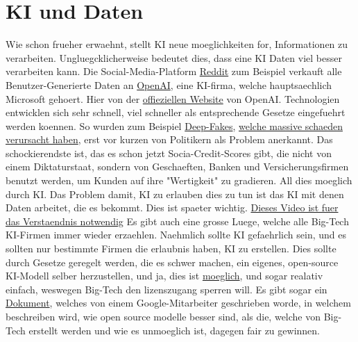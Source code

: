 \documentclass{report}
\begin{document}
\section{KI und Daten}
Wie schon frueher erwaehnt, stellt KI neue moeglichkeiten for, Informationen zu verarbeiten. Ungluegcklicherweise bedeutet dies, dass eine KI Daten viel besser verarbeiten kann.
Die Social-Media-Platform \hyperlink{reddit.com}{Reddit} zum Beispiel verkauft alle Benutzer-Generierte Daten an \hyperlink{https://openai.com/}{OpenAI}, eine KI-firma, welche hauptsaechlich Microsoft gehoert.
Hier von der \hyperlink{https://openai.com/index/openai-and-reddit-partnership/}{offieziellen Website} von OpenAI. 
\newline
\newline
Technologien entwicklen sich sehr schnell, viel schneller als entsprechende Gesetze eingefuehrt werden koennen. So wurden zum Beispiel \hyperlink{https://en.wikipedia.org/wiki/Deepfake}{Deep-Fakes}, \hyperlink{https://edition.cnn.com/2024/05/16/tech/arup-deepfake-scam-loss-hong-kong-intl-hnk/index.html}{welche massive schaeden verursacht haben}, erst vor kurzen von Politikern als Problem anerkannt.
\newline
\newline
Das schockierendste ist, das es schon jetzt Socia-Credit-Scores gibt, die nicht von einem Diktaturstaat, sondern von Geschaeften, Banken und Versicherungsfirmen benutzt werden, um Kunden auf ihre "Wertigkeit" zu gradieren. All dies moeglich durch KI.
Das Problem damit, KI zu erlauben dies zu tun ist das KI mit denen Daten arbeitet, die es bekommt. Dies ist spaeter wichtig.
\hyperlink{https://youtube.com/watch?v=VUhKTngpd8c}{Dieses Video ist fuer das Verstaendnis notwendig}
\newline
\newline
Es gibt auch eine grosse Luege, welche alle Big-Tech KI-Firmen immer wieder erzaehlen. Naehmlich sollte KI gefaehrlich sein, und es sollten nur bestimmte Firmen die erlaubnis haben, KI zu erstellen. Dies sollte durch Gesetze geregelt werden, die es schwer machen, ein eigenes, open-source KI-Modell selber herzustellen, und ja, dies ist \hyperlink{https://youtube.com/watch?v=188fipF-i5I}{moeglich}, und sogar realativ einfach, weswegen Big-Tech den lizenszugang sperren will.
\newline
Es gibt sogar ein \hyperlink{https://www.theguardian.com/technology/2023/may/05/google-engineer-open-source-technology-ai-openai-chatgpt}{Dokument}, welches von einem Google-Mitarbeiter geschrieben worde, in welchem beschreiben wird, wie open source modelle besser sind, als die, welche von Big-Tech erstellt werden und wie es unmoeglich ist, dagegen fair zu gewinnen.
\end{document}

